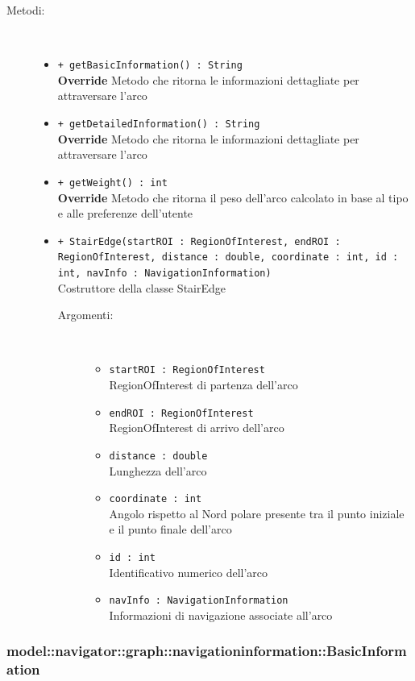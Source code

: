 \documentclass[../DefinizioneDiProdotto.tex]{subfiles}
\begin{document}
\begin{description}
\begin{itemize}
\end{itemize}
\item[Metodi:] \
\begin{itemize}
\item \texttt{+ getBasicInformation() : String}\\
\textbf{Override} Metodo che ritorna le informazioni dettagliate per attraversare l'arco
 \item \texttt{+ getDetailedInformation() : String}\\
\textbf{Override} Metodo che ritorna le informazioni dettagliate per attraversare l'arco
 \item \texttt{+ getWeight() : int}\\
\textbf{Override} Metodo che ritorna il peso dell'arco calcolato in base al tipo e alle preferenze dell'utente
 \item \texttt{+ StairEdge(startROI : RegionOfInterest, endROI : RegionOfInterest, distance : double, coordinate : int, id : int, navInfo : NavigationInformation)}\\
Costruttore della classe StairEdge
 \begin{description}
\item[Argomenti:] \
\begin{itemize}
\item \texttt{startROI : RegionOfInterest}\\
RegionOfInterest di partenza dell'arco\item \texttt{endROI : RegionOfInterest}\\
RegionOfInterest di arrivo dell'arco\item \texttt{distance : double}\\
Lunghezza dell'arco\item \texttt{coordinate : int}\\
Angolo rispetto al Nord polare presente tra il punto iniziale e il punto finale dell'arco\item \texttt{id : int}\\
Identificativo numerico dell'arco\item \texttt{navInfo : NavigationInformation}\\
Informazioni di navigazione associate all'arco\end{itemize}
\end{description}
\end{itemize}
\end{description}

\subsubsection{model::navigator::graph::navigationinformation::BasicInformation}
\end{document}
